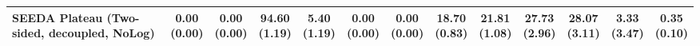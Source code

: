 \begin{table}[H]
{\begin{tabular}{l|cccccc|cccccc}
SEEDA Plateau (Two-sided, decoupled, NoLog) & \makecell{0.00 \\ (0.00)} & \makecell{0.00 \\ (0.00)} & {\cellcolor[HTML]{C8E6C9}} \bfseries \makecell{94.60 \\ (1.19)} & \makecell{5.40 \\ (1.19)} & \makecell{0.00 \\ (0.00)} & \makecell{0.00 \\ (0.00)} & \makecell{18.70 \\ (0.83)} & \makecell{21.81 \\ (1.08)} & {\cellcolor[HTML]{C8E6C9}} \makecell{27.73 \\ (2.96)} & \bfseries \makecell{28.07 \\ (3.11)} & \makecell{3.33 \\ (3.47)} & \makecell{0.35 \\ (0.10)} \\
\bottomrule
\end{tabular}
}%
\end{table}

